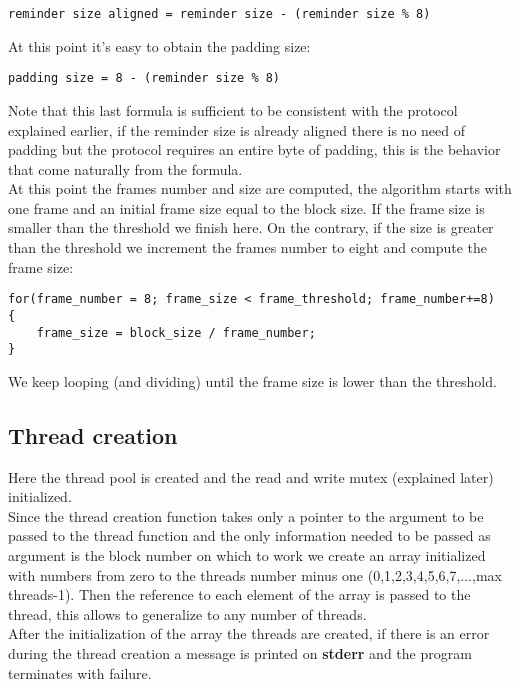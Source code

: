 \begin{scripting}
\begin{verbatim}
reminder size aligned = reminder size - (reminder size % 8)
\end{verbatim}
\end{scripting}

At this point it's easy to obtain the padding size:

\begin{scripting}
\begin{verbatim}
padding size = 8 - (reminder size % 8)
\end{verbatim}
\end{scripting}

Note that this last formula is sufficient to be consistent with the protocol explained earlier, if the reminder size is already aligned there is no need of padding but the protocol requires an entire byte of padding, this is the behavior that come naturally from the formula.\\
At this point the frames number and size are computed, the algorithm starts with one frame and an initial frame size equal to the block size. If the frame size is smaller than the threshold we finish here. On the contrary, if the size is greater than the threshold we increment the frames number to eight and compute the frame size:

\begin{center}
\begin{lstlisting}
for(frame_number = 8; frame_size < frame_threshold; frame_number+=8)
{
	frame_size = block_size / frame_number;
}
\end{lstlisting}
\end{center}

We keep looping (and dividing) until the frame size is lower than the threshold.


\subsection{Thread creation}
Here the thread pool is created and the read and write mutex (explained later) initialized.\\
Since the thread creation function takes only a pointer to the argument to be passed to the thread function and the only information needed to be passed as argument is the block number on which to work we create an array initialized with numbers from zero to the threads number minus one (0,1,2,3,4,5,6,7,...,max threads-1). Then the reference to each element of the array is passed to the thread, this allows to generalize to any number of threads.\\
After the initialization of the array the threads are created, if there is an error during the thread creation a message is printed on \textbf{stderr} and the program terminates with failure.


